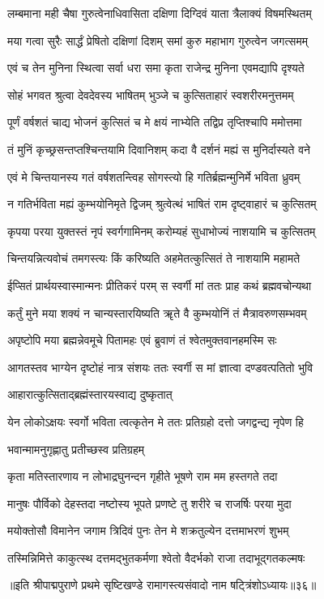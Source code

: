 \twolineshloka
{लम्बमाना मही चैषा गुरुत्वेनाधिवासिता}
{दक्षिणा दिग्दिवं याता त्रैलाक्यं विषमस्थितम्}%

\twolineshloka
{मया गत्वा सुरैः सार्द्धं प्रेषितो दक्षिणां दिशम्}
{समां कुरु महाभाग गुरुत्वेन जगत्समम्}%

\twolineshloka
{एवं च तेन मुनिना स्थित्वा सर्वा धरा समा}
{कृता राजेन्द्र मुनिना एवमद्यापि दृश्यते}%

\twolineshloka
{सोहं भगवत श्रुत्वा देवदेवस्य भाषितम्}
{भुञ्जे च कुत्सिताहारं स्वशरीरमनुत्तमम्}%

\twolineshloka
{पूर्णं वर्षशतं चाद्य भोजनं कुत्सितं च मे}
{क्षयं नाभ्येति तद्विप्र तृप्तिश्चापि ममोत्तमा}%

\twolineshloka
{तं मुनिं कृच्छ्रसन्तप्तश्चिन्तयामि दिवानिशम्}
{कदा वै दर्शनं मह्यं स मुनिर्दास्यते वने}%

\twolineshloka
{एवं मे चिन्तयानस्य गतं वर्षशतन्त्विह}
{सोगस्त्यो हि गतिर्ब्रह्मन्मुनिर्मे भविता ध्रुवम्}%

\twolineshloka
{न गतिर्भविता मह्यं कुम्भयोनिमृते द्विजम्}
{श्रुत्वेत्थं भाषितं राम दृष्ट्वाहारं च कुत्सितम्}%

\twolineshloka
{कृपया परया युक्तस्तं नृपं स्वर्गगामिनम्}
{करोम्यहं सुधाभोज्यं नाशयामि च कुत्सितम्}%

\twolineshloka
{चिन्तयन्नित्यवोचं तमगस्त्यः किं करिष्यति}
{अहमेतत्कुत्सितं ते नाशयामि महामते}%

\twolineshloka
{ईप्सितं प्रार्थयस्वास्मान्मनः प्रीतिकरं परम्}
{स स्वर्गी मां ततः प्राह कथं ब्रह्मवचोन्यथा}%

\twolineshloka
{कर्तुं मुने मया शक्यं न चान्यस्तारयिष्यति}
{ॠते वै कुम्भयोनिं तं मैत्रावरुणसम्भवम्}%

\twolineshloka
{अपृष्टोपि मया ब्रह्मन्नेवमूचे पितामहः}
{एवं ब्रुवाणं तं श्वेतमुक्तवानहमस्मि सः}%

\twolineshloka
{आगतस्तव भाग्येन दृष्टोहं नात्र संशयः}
{ततः स्वर्गी स मां ज्ञात्वा दण्डवत्पतितो भुवि}%



\onelineshloka
{आहारात्कुत्सिताद्ब्रह्मंस्तारयस्वाद्य दुष्कृतात्}%

\twolineshloka
{येन लोकोऽक्षयः स्वर्गो भविता त्वत्कृतेन मे}
{ततः प्रतिग्रहो दत्तो जगद्वन्द्य नृपेण हि}%


\onelineshloka
{भवान्मामनुगृह्णातु प्रतीच्छस्व प्रतिग्रहम्}%

\twolineshloka
{कृता मतिस्तारणाय न लोभाद्रघुनन्दन}
{गृहीते भूषणे राम मम हस्तगते तदा}%

\twolineshloka
{मानुषः पौर्विको देहस्तदा नष्टोस्य भूपते}
{प्रणष्टे तु शरीरे च राजर्षिः परया मुदा}%

\twolineshloka
{मयोक्तोसौ विमानेन जगाम त्रिदिवं पुनः}
{तेन मे शक्रतुल्येन दत्तमाभरणं शुभम्}%

\twolineshloka
{तस्मिन्निमित्ते काकुत्स्थ दत्तमद्भुतकर्मणा}
{श्वेतो वैदर्भको राजा तदाभूद्गतकल्मषः}%

{॥इति श्रीपाद्मपुराणे प्रथमे सृष्टिखण्डे रामागस्त्यसंवादो नाम षट्त्रिंशोऽध्यायः॥३६॥}
